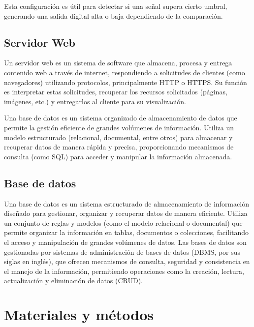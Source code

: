 \documentclass[conference]{IEEEtran}
\begin{document}
	Esta configuración es útil para detectar si una señal supera cierto umbral, generando una salida digital alta o baja dependiendo de la comparación.
	
	\subsection{Servidor Web}
	Un servidor web es un sistema de software que almacena, procesa y entrega contenido web a través de internet, respondiendo a solicitudes de clientes (como navegadores) utilizando protocolos, principalmente HTTP o HTTPS. Su función es interpretar estas solicitudes, recuperar los recursos solicitados (páginas, imágenes, etc.) y entregarlos al cliente para su visualización.
	
	Una base de datos es un sistema organizado de almacenamiento de datos que permite la gestión eficiente de grandes volúmenes de información. Utiliza un modelo estructurado (relacional, documental, entre otros) para almacenar y recuperar datos de manera rápida y precisa, proporcionando mecanismos de consulta (como SQL) para acceder y manipular la información almacenada.
	
	\subsection{Base de datos}
	Una base de datos es un sistema estructurado de almacenamiento de información diseñado para gestionar, organizar y recuperar datos de manera eficiente. Utiliza un conjunto de reglas y modelos (como el modelo relacional o documental) que permite organizar la información en tablas, documentos o colecciones, facilitando el acceso y manipulación de grandes volúmenes de datos. Las bases de datos son gestionadas por sistemas de administración de bases de datos (DBMS, por sus siglas en inglés), que ofrecen mecanismos de consulta, seguridad y consistencia en el manejo de la información, permitiendo operaciones como la creación, lectura, actualización y eliminación de datos (CRUD).
	\section{Materiales y métodos}
\end{document}
